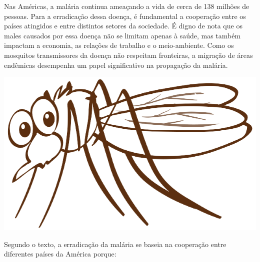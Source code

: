 \begin{myquote}

\begin{minipage}{0.7\textwidth}
Nas Américas, a malária continua ameaçando a vida de cerca de 138 milhões de pessoas.
Para a erradicação dessa doença, é fundamental a cooperação entre os países atingidos e 
entre distintos setores da sociedade. É digno de nota que os males causados por essa doença
não se limitam apenas à saúde, mas também impactam a economia, as relações de trabalho e 
o meio-ambiente. Como os mosquitos transmissores da doença não respeitam fronteiras, a migração
de áreas endêmicas desempenha um papel significativo na propagação da malária.
\end{minipage}
\hfill
\begin{minipage}{0.2\textwidth}
  \centering
  \includegraphics[width=\textwidth]{./imgSAEB_7_POR/media/image26.png}
  \label{fig:exemplo}
\end{minipage}



\end{myquote}

Segundo o texto, a erradicação da malária se baseia na cooperação entre diferentes países 
da América porque:

